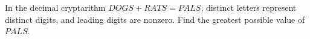 In the decimal cryptarithm $DOGS+RATS=PALS$, distinct letters represent distinct digits, and leading digits are nonzero. Find the greatest possible value of $PALS$.
